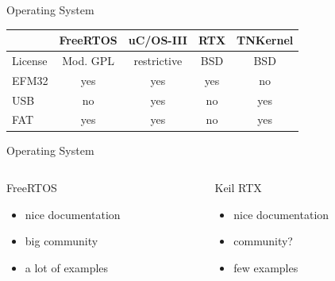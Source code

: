 \documentclass[compress,red]{beamer}
\begin{document}

\begin{frame}{Operating System}
 \large
 \begin{center}
  \begin{tabular}{lcccc}
           & FreeRTOS & uC/OS-III & RTX & TNKernel \\
   \hline
   License & Mod. GPL & restrictive & BSD & BSD \\
   EFM32   & yes      & yes         & yes & no  \\
   USB     & no       & yes         & no  & yes \\
   FAT     & yes      & yes         & no  & yes \\
  \end{tabular}
 \end{center}
\end{frame}


\begin{frame}{Operating System}
  \begin{columns}[T] %
    \begin{column}{.48\textwidth}
      FreeRTOS
      \begin{itemize}
        \item nice documentation
        \item big community
        \item a lot of examples
      \end{itemize}
    \end{column}
    \hfill%
    \begin{column}{.48\textwidth}
      Keil RTX
      \begin{itemize}
        \item nice documentation
        \item community?
        \item few examples
      \end{itemize}
    \end{column}%
  \end{columns}
\end{frame}

\end{document}
